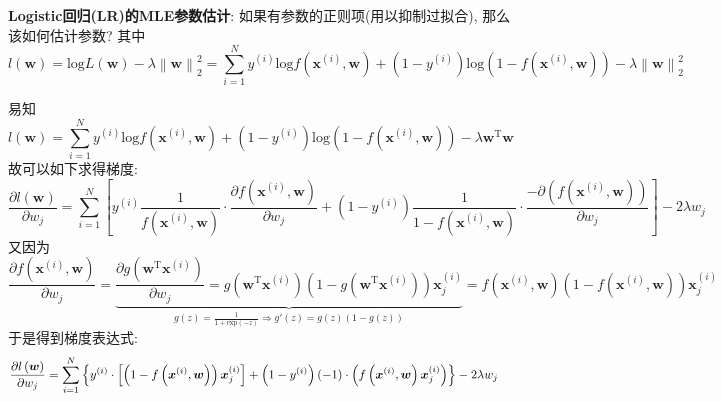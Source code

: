 \documentclass{article}
\begin{document}
\begin{homeworkProblem}
	\textbf{Logistic回归(LR)的MLE参数估计}: 如果有参数的正则项(用以抑制过拟合), 那么该如何估计参数? 其中
	$$
	l\left( \boldsymbol{w} \right) =\text{log} L\left( \boldsymbol{w} \right) -\lambda \left\| \boldsymbol{w} \right\| _{2}^{2}=\sum_{i=1}^N{y^{\left( i \right)}\text{log} f\left( \boldsymbol{x}^{\left( i \right)},\boldsymbol{w} \right) +\left( 1-y^{\left( i \right)} \right) \text{log} \left( 1-f\left( \boldsymbol{x}^{\left( i \right)},\boldsymbol{w} \right) \right)}-\lambda \left\| \boldsymbol{w} \right\| _{2}^{2}
	$$

	\solution 易知$$l\left( \boldsymbol{w} \right) =\sum_{i=1}^N{y^{\left( i \right)}\text{log} f\left( \boldsymbol{x}^{\left( i \right)},\boldsymbol{w} \right) +\left( 1-y^{\left( i \right)} \right) \text{log} \left( 1-f\left( \boldsymbol{x}^{\left( i \right)},\boldsymbol{w} \right) \right)}-\lambda \boldsymbol{w}^{\text{T}}\boldsymbol{w}
	$$
	故可以如下求得梯度:
	$$
	\frac{\partial l\left( \boldsymbol{w} \right)}{\partial w_j}=\sum_{i=1}^N{\left[ y^{\left( i \right)}\frac{1}{f\left( \boldsymbol{x}^{\left( i \right)},\boldsymbol{w} \right)}\cdot \frac{\partial f\left( \boldsymbol{x}^{\left( i \right)},\boldsymbol{w} \right)}{\partial w_j}+\left( 1-y^{\left( i \right)} \right) \frac{1}{1-f\left( \boldsymbol{x}^{\left( i \right)},\boldsymbol{w} \right)}\cdot \frac{-\partial \left( f\left( \boldsymbol{x}^{\left( i \right)},\boldsymbol{w} \right) \right)}{\partial w_j} \right]}-2\lambda w_j
	$$
	又因为
	$$
	\frac{\partial f\left( \boldsymbol{x}^{\left( i \right)},\boldsymbol{w} \right)}{\partial w_j}=\underset{g\left( z \right) =\frac{1}{1+\text{exp} \left( -z \right)}\Rightarrow g'\left( z \right) =g\left( z \right) \left( 1-g\left( z \right) \right)}{\underbrace{\frac{\partial g\left( \boldsymbol{w}^{\text{T}}\boldsymbol{x}^{\left( i \right)} \right)}{\partial w_j}=g\left( \boldsymbol{w}^{\text{T}}\boldsymbol{x}^{\left( i \right)} \right) \left( 1-g\left( \boldsymbol{w}^{\text{T}}\boldsymbol{x}^{\left( i \right)} \right) \right) \boldsymbol{x}_{j}^{\left( i \right)}}}=f\left( \boldsymbol{x}^{\left( i \right)},\boldsymbol{w} \right) \left( 1-f\left( \boldsymbol{x}^{\left( i \right)},\boldsymbol{w} \right) \right) \boldsymbol{x}_{j}^{\left( i \right)}
	$$
	于是得到梯度表达式:
	\begin{align}
		\frac{\partial l\left( \boldsymbol{w} \right)}{\partial w_j}&=\sum_{i=1}^N{\left\{ y^{\left( i \right)}\cdot \left[ \left( 1-f\left( \boldsymbol{x}^{\left( i \right)},\boldsymbol{w} \right) \right) \boldsymbol{x}_{j}^{\left( i \right)} \right] +\left( 1-y^{\left( i \right)} \right) \left( -1 \right) \cdot \left( f\left( \boldsymbol{x}^{\left( i \right)},\boldsymbol{w} \right) \boldsymbol{x}_{j}^{\left( i \right)} \right) \right\}}-2\lambda w_j \notag

\end{align}
\end{homeworkProblem}
\end{document}
